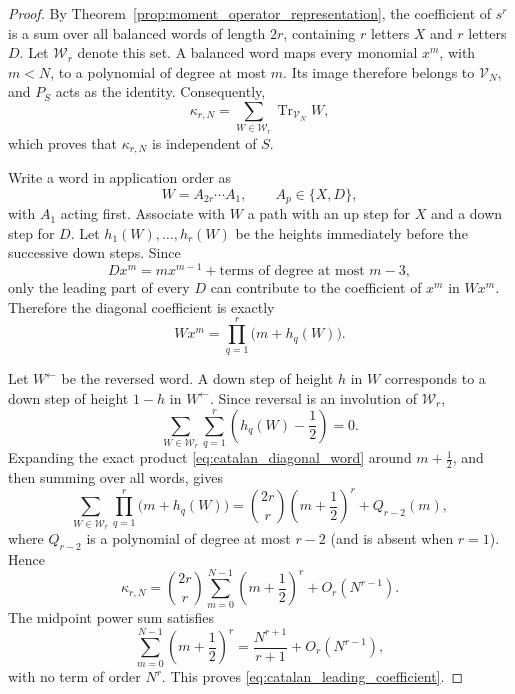 \documentclass[11pt]{article}
\numberwithin{equation}{section}
\newcommand{\1}{\mathbf 1}
\begin{document}
\begin{proof}
By Theorem~\ref{prop:moment_operator_representation}, the coefficient of
\(s^r\) is a sum over all balanced words of length \(2r\), containing \(r\)
letters \(X\) and \(r\) letters \(D\).  Let \(\mathcal W_r\) denote this set.
A balanced word maps every monomial \(x^m\), with \(m<N\), to a polynomial of
degree at most \(m\).  Its image therefore belongs to \(\mathcal V_N\), and
\(P_S\) acts as the identity.  Consequently,
\begin{equation}
    \kappa_{r,N}
    =
    \sum_{W\in\mathcal W_r}
    \operatorname{Tr}_{\mathcal V_N}W,
    \label{eq:catalan_word_trace_sum}
\end{equation}
which proves that \(\kappa_{r,N}\) is independent of \(S\).

Write a word in application order as
\[
    W=A_{2r}\cdots A_1,
    \qquad
    A_p\in\{X,D\},
\]
with \(A_1\) acting first.  Associate with \(W\) a path with an up step for
\(X\) and a down step for \(D\).  Let
\(h_1(W),\ldots,h_r(W)\) be the heights immediately before the successive down
steps.  Since
\[
    Dx^m=mx^{m-1}+\text{terms of degree at most }m-3,
\]
only the leading part of every \(D\) can contribute to the coefficient of
\(x^m\) in \(Wx^m\).  Therefore the diagonal coefficient is exactly
\begin{equation}
    [x^m]Wx^m
    =
    \prod_{q=1}^r\bigl(m+h_q(W)\bigr).
    \label{eq:catalan_diagonal_word}
\end{equation}

Let \(W^{\leftarrow}\) be the reversed word.  A down step of height \(h\) in
\(W\) corresponds to a down step of height \(1-h\) in
\(W^{\leftarrow}\).  Since reversal is an involution of \(\mathcal W_r\),
\begin{equation}
    \sum_{W\in\mathcal W_r}\sum_{q=1}^r
    \left(h_q(W)-\frac12\right)=0.
    \label{eq:height_reversal_cancellation}
\end{equation}
Expanding the exact product \eqref{eq:catalan_diagonal_word} around
\(m+\tfrac12\), and then summing over all words, gives
\[
    \sum_{W\in\mathcal W_r}
    \prod_{q=1}^r\bigl(m+h_q(W)\bigr)
    =
    \binom{2r}{r}\left(m+\frac12\right)^r
    +Q_{r-2}(m),
\]
where \(Q_{r-2}\) is a polynomial of degree at most \(r-2\) (and is absent
when \(r=1\)).  Hence
\[
    \kappa_{r,N}
    =
    \binom{2r}{r}
    \sum_{m=0}^{N-1}\left(m+\frac12\right)^r
    +O_r(N^{r-1}).
\]
The midpoint power sum satisfies
\[
    \sum_{m=0}^{N-1}\left(m+\frac12\right)^r
    =
    \frac{N^{r+1}}{r+1}+O_r(N^{r-1}),
\]
with no term of order \(N^r\).  This proves
\eqref{eq:catalan_leading_coefficient}.
\end{proof}
\end{document}
